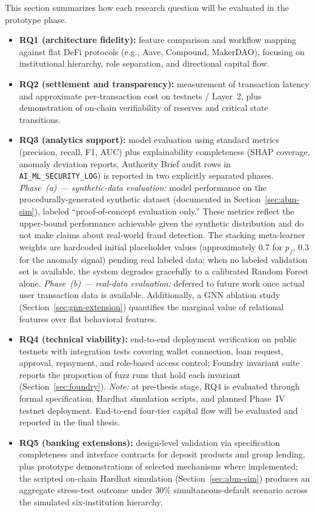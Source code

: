 \documentclass[12pt,a4paper]{report}
\begin{document}
This section summarizes how each research question will be evaluated in the prototype phase.
\begin{itemize}[noitemsep]
\item \textbf{RQ1 (architecture fidelity):} feature comparison and workflow mapping against flat DeFi protocols (e.g., Aave, Compound, MakerDAO), focusing on institutional hierarchy, role separation, and directional capital flow.
\item \textbf{RQ2 (settlement and transparency):} measurement of transaction latency and approximate per-transaction cost on testnets / Layer~2, plus demonstration of on-chain verifiability of reserves and critical state transitions.
\item \textbf{RQ3 (analytics support):} model evaluation using standard metrics (precision, recall, F1, AUC) plus explainability completeness (SHAP coverage, anomaly deviation reports, Authority Brief audit rows in \texttt{AI\_ML\_SECURITY\_LOG}) is reported in two explicitly separated phases. \textit{Phase~(a) --- synthetic-data evaluation:} model performance on the procedurally-generated synthetic dataset (documented in Section~\ref{sec:abm-sim}), labeled ``proof-of-concept evaluation only.'' These metrics reflect the upper-bound performance achievable given the synthetic distribution and do not make claims about real-world fraud detection. The stacking meta-learner weights are hardcoded initial placeholder values (approximately 0.7 for $p_f$, 0.3 for the anomaly signal) pending real labeled data; when no labeled validation set is available, the system degrades gracefully to a calibrated Random Forest alone. \textit{Phase~(b) --- real-data evaluation:} deferred to future work once actual user transaction data is available. Additionally, a GNN ablation study (Section~\ref{sec:gnn-extension}) quantifies the marginal value of relational features over flat behavioral features.
\item \textbf{RQ4 (technical viability):} end-to-end deployment verification on public testnets with integration tests covering wallet connection, loan request, approval, repayment, and role-based access control; Foundry invariant suite reports the proportion of fuzz runs that hold each invariant (Section~\ref{sec:foundry}). \textit{Note:} at pre-thesis stage, RQ4 is evaluated through formal specification, Hardhat simulation scripts, and planned Phase~IV testnet deployment. End-to-end four-tier capital flow will be evaluated and reported in the final thesis.
\item \textbf{RQ5 (banking extensions):} design-level validation via specification completeness and interface contracts for deposit products and group lending, plus prototype demonstrations of selected mechanisms where implemented; the scripted on-chain Hardhat simulation (Section~\ref{sec:abm-sim}) produces an aggregate stress-test outcome under 30\% simultaneous-default scenario across the simulated six-institution hierarchy.
\end{itemize}
\end{document}
